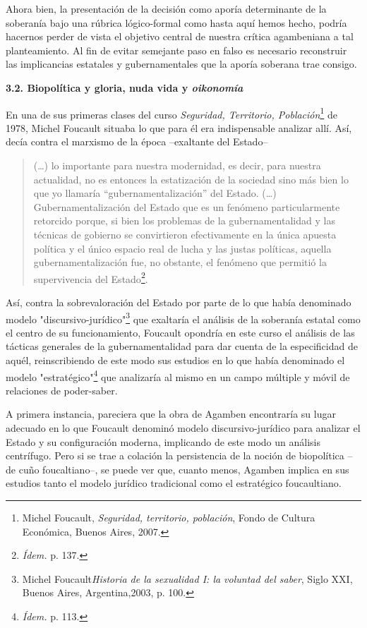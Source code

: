 \documentclass{book}
\begin{document}
Ahora bien, la presentación de la decisión como aporía determinante de
la soberanía bajo una rúbrica lógico-formal como hasta aquí hemos hecho,
podría hacernos perder de vista el objetivo central de nuestra crítica
agambeniana a tal planteamiento. Al fin de evitar semejante paso en
falso es necesario reconstruir las implicancias estatales y
gubernamentales que la aporía soberana trae consigo.

\textbf{3.2. Biopolítica y gloria, nuda vida y \emph{oikonomía}}

En una de sus primeras clases del curso \emph{Seguridad, Territorio,
Población}\footnote{Michel Foucault, \emph{Seguridad, territorio,
  población}, Fondo de Cultura Económica, Buenos Aires, 2007.} de 1978,
Michel Foucault situaba lo que para él era indispensable analizar allí.
Así, decía contra el marxismo de la época --exaltante del Estado--

\begin{quote}
(\dots) lo importante para nuestra modernidad, es decir, para
nuestra actualidad, no es entonces la estatización de la sociedad sino
más bien lo que yo llamaría ``gubernamentalización'' del Estado.
(\dots) Gubernamentalización del Estado que es un fenómeno
particularmente retorcido porque, si bien los problemas de la
gubernamentalidad y las técnicas de gobierno se convirtieron
efectivamente en la única apuesta política y el único espacio real de
lucha y las justas políticas, aquella gubernamentalización fue, no
obstante, el fenómeno que permitió la supervivencia del
Estado\footnote{\emph{Ídem.} p. 137.}.
\end{quote}

Así, contra la sobrevaloración del Estado por parte de lo que había
denominado modelo "discursivo-jurídico"\footnote{Michel
  Foucault\emph{Historia de la sexualidad I: la voluntad del saber},
  Siglo XXI, Buenos Aires, Argentina,2003, p. 100.} que exaltaría el
análisis de la soberanía estatal como el centro de su funcionamiento,
Foucault opondría en este curso el análisis de las tácticas generales de
la gubernamentalidad para dar cuenta de la especificidad de aquél,
reinscribiendo de este modo sus estudios en lo que había denominado el
modelo "estratégico"\footnote{\emph{Ídem.} p. 113.} que analizaría al
mismo en un campo múltiple y móvil de relaciones de poder-saber.

A primera instancia, pareciera que la obra de Agamben encontraría su
lugar adecuado en lo que Foucault denominó modelo discursivo-jurídico
para analizar el Estado y su configuración moderna, implicando de este
modo un análisis centrífugo. Pero si se trae a colación la persistencia
de la noción de biopolítica --de cuño foucaltiano--, se puede ver que,
cuanto menos, Agamben implica en sus estudios tanto el modelo jurídico
tradicional como el estratégico foucaultiano.
\end{document}
